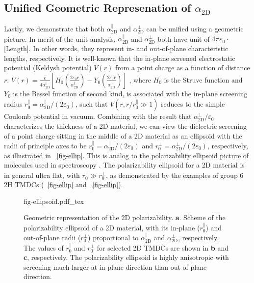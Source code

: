 \subsection{Unified Geometric Represenation of $\alpha_{\mathrm{2D}}$}
\label{sec:diel-unif-geom-repr}

%
Lastly, we demonstrate that both $\alpha_{\mathrm{2D}}^{\parallel}$
and $\alpha_{\mathrm{2D}}^{\perp}$ can be unified using a geometric
picture. In merit of the unit analysis,
$\alpha_{\mathrm{2D}}^{\parallel}$ and $\alpha_{\mathrm{2D}}^{\perp}$
both have unit of $4\pi\varepsilon_{0} \cdot$[Length]. In other words,
they represent in- and out-of-plane characteristic lengths,
respectively. It is well-known that the in-plane screened
electrostatic potential (Keldysh potential) $V(r)$ from a point charge
as a function of distance $r$:
$V(r) = {\displaystyle \frac{e}{4 \alpha_{\mathrm{2D}}^{\parallel}}}
\left[H_{0}({\displaystyle \frac{2\varepsilon_{0}
      r}{\alpha_{\mathrm{2D}}^{\parallel}}}) - Y_{0}( {\displaystyle
    \frac{2
      \varepsilon_{0}r}{\alpha_{\mathrm{2D}}^{\parallel}}})\right]$
\cite{Keldysh_1979_eps_multi,Pulci_2014_exciton}, where $H_{0}$ is the Struve
function and $Y_{0}$ is the Bessel function of second kind, is
associated with the in-plane screening radius
$r_{0}^{\parallel}=\alpha_{\mathrm{2D}}^{\parallel}/(2
\varepsilon_{0})$, such that $V(r,r/r^{\parallel}_{0} \gg 1)$ reduces
to the simple Coulomb potential in vacuum. Combining with the result
that $\alpha_{\mathrm{2D}}^{\perp}/\varepsilon_{0}$ characterizes the
thickness of a 2D material, we can view the dielectric screening of a
point charge sitting in the middle of a 2D material as an ellipsoid
with the radii of principle axes to be
$r_{0}^{\parallel} = \alpha_{\mathrm{2D}}^{\parallel}/(2
\varepsilon_{0})$ and
$r_{0}^{\perp} = \alpha^{\perp}_{\mathrm{2D}}/(2 \varepsilon_{0})$,
respectively, as illustrated in ~\autoref{fig-ellip}.
This is analog to the polarizability ellipsoid picture of molecules
used in spectroscopy \cite{Banwell_1994_spectro_book}. The polarizability ellipsoid
for a 2D material is in general ultra flat, with
$r_{0}^{\parallel} \gg r_{0}^{\perp}$, as demonstrated by the examples
of group 6 2H TMDCs (~\autoref{fig-ellip} and
~\autoref{fig-ellip}).
%
\begin{figure}[!htbp]
  \centering
  {fig-ellipsoid.pdf_tex}
  \caption{\label{fig-ellip} Geometric representation of the
      2D polarizability. \textbf{a}. Scheme of the polarizability
    ellipsoid of a 2D material, with its in-plane
    ($r_{0}^{\parallel}$) and out-of-plane radii
    ($r_{\mathrm{0}}^{\perp}$) proportional to
    $\alpha_{\mathrm{2D}}^{\parallel}$ and
    $\alpha_{\mathrm{2D}}^{\perp}$, respectively.  The values of
    $r_{0}^{\parallel}$ and $r_{0}^{\perp}$ for selected 2D TMDCs are
    shown in \textbf{b} and \textbf{c}, respectively.  The
    polarizability ellipsoid is highly anisotropic with screening much
    larger at in-plane direction than out-of-plane direction.}
\end{figure}

